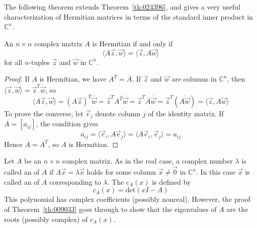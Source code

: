 \documentclass{ximera}
\begin{document}
The following theorem extends Theorem~\ref{th:024396}, and gives a very useful characterization of Hermitian matrices in terms of the standard inner product in $\mathbb{C}^n$.


\begin{theorem}\label{th:025697}
An $n \times n$ complex matrix $A$ is Hermitian if and only if
\begin{equation*}
\langle A\vec{z}, \vec{w} \rangle = \langle \vec{z}, A\vec{w} \rangle
\end{equation*}
for all $n$-tuples $\vec{z}$ and $\vec{w}$ in $\mathbb{C}^n$.
\end{theorem}

\begin{proof}
If $A$ is Hermitian, we have $A^T = \overline{A}$. If $\vec{z}$ and $\vec{w}$ are columns in $\mathbb{C}^n$, then $\langle \vec{z}, \vec{w} \rangle = \vec{z}^T\overline{\vec{w}}$, so
\begin{equation*}
\langle A\vec{z}, \vec{w} \rangle =(A\vec{z})^T\overline{\vec{w}} = \vec{z}^TA^T\overline{\vec{w}} = \vec{z}^T\overline{A}\overline{\vec{w}} = \vec{z}^T(\overline{A\vec{w}}) = \langle \vec{z}, A\vec{w} \rangle
\end{equation*}
To prove the converse, let $\vec{e}_{j}$ denote column $j$ of the identity matrix. If $A = \left[ a_{ij} \right]$, the condition gives
\begin{equation*}
\overline{a}_{ij} = \langle \vec{e}_{i}, A\vec{e}_{j} \rangle = \langle A\vec{e}_{i}, \vec{e}_{j} \rangle = {a}_{ij}
\end{equation*}
Hence $\overline{A} = A^T$, so $A$ is Hermitian.
\end{proof}

Let $A$ be an $n \times n$ complex matrix. As in the real case, a complex number $\lambda$ is called an  of $A$ if $A\vec{x} = \lambda \vec{x}$ holds for some column $\vec{x} \neq \vec{0}$ in $\mathbb{C}^n$. In this case $\vec{x}$ is called an  of $A$ corresponding to $\lambda$. The  $c_{A}(x)$ is defined by
\begin{equation*}
c_{A}(x) = \mbox{det}(xI - A)
\end{equation*}
This polynomial has complex coefficients (possibly nonreal). However, the proof of Theorem~\ref{th:009033} goes through to show that the eigenvalues of $A$ are the roots (possibly complex) of $c_{A}(x)$.
\end{document}
